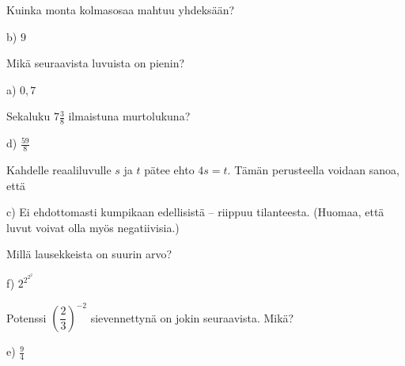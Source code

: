 \begin{tehtava}
Kuinka monta kolmasosaa mahtuu yhdeksään?
    \begin{vastaus}
	 b) $9$
    \end{vastaus}
\end{tehtava}

\begin{tehtava}
Mikä seuraavista luvuista on pienin?
    \begin{vastaus}
	 a) $0,7$
    \end{vastaus}
\end{tehtava}

\begin{tehtava} %
Sekaluku $7\frac{3}{8}$ ilmaistuna murtolukuna?
    \begin{vastaus}
	 d) $\frac{59}{8}$
    \end{vastaus}
\end{tehtava}

\begin{tehtava}
Kahdelle reaaliluvulle $s$ ja $t$ pätee ehto $4s=t$. Tämän perusteella voidaan sanoa, että
    \begin{vastaus}
	 c) Ei ehdottomasti kumpikaan edellisistä -- riippuu tilanteesta. (Huomaa, että luvut voivat olla myös negatiivisia.)
    \end{vastaus}
\end{tehtava}

\begin{tehtava}
Millä lausekkeista on suurin arvo?
	\begin{vastaus}
	 f) $2^{2^{2^2}}$
	\end{vastaus}
\end{tehtava}

\begin{tehtava}
Potenssi $\left( \dfrac{2}{3} \right)^{-2}$ sievennettynä on jokin seuraavista. Mikä?
\begin{vastaus}
e) $\frac{9}{4}$
\end{vastaus}
\end{tehtava}

